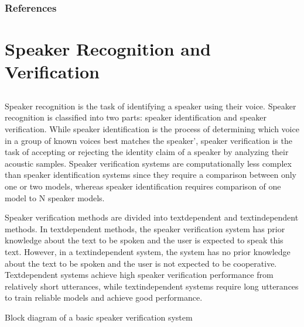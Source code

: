 \documentclass[letterpaper,10pt,english]{jupyterBook}
\begin{document}
\subsubsection{References}
\label{\detokenize{Recognition/Speech_Recognition:references}}
\sphinxstepscope


\section{Speaker Recognition and Verification}
\label{\detokenize{Recognition/Speaker_Recognition_and_Verification:speaker-recognition-and-verification}}\label{\detokenize{Recognition/Speaker_Recognition_and_Verification::doc}}

\subsection{}
\label{\detokenize{Recognition/Speaker_Recognition_and_Verification:introduction-to-speaker-recognition}}
\sphinxAtStartPar
Speaker recognition is the task of identifying a speaker using their
voice. Speaker recognition is classified into two parts: speaker
identification and speaker verification. While speaker identification is
the process of determining which voice in a group of known voices best
matches the speaker’, speaker verification is the task of accepting or
rejecting the identity claim of a speaker by analyzing their acoustic
samples. Speaker verification systems are computationally less complex
than speaker identification systems since they require a comparison
between only one or two models, whereas speaker identification requires
comparison of one model to N speaker models.

\sphinxAtStartPar
Speaker verification methods are divided into text\sphinxhyphen{}dependent and
text\sphinxhyphen{}independent methods. In text\sphinxhyphen{}dependent methods, the speaker
verification system has prior knowledge about the text to be spoken and
the user is expected to speak this text. However, in a text\sphinxhyphen{}independent
system, the system has no prior knowledge about the text to be spoken
and the user is not expected to be cooperative. Text\sphinxhyphen{}dependent systems
achieve high speaker verification performance from relatively short
utterances, while text\sphinxhyphen{}independent systems require long utterances to
train reliable models and achieve good performance.

\sphinxAtStartPar
Block diagram of a basic speaker verification system
\end{document}
